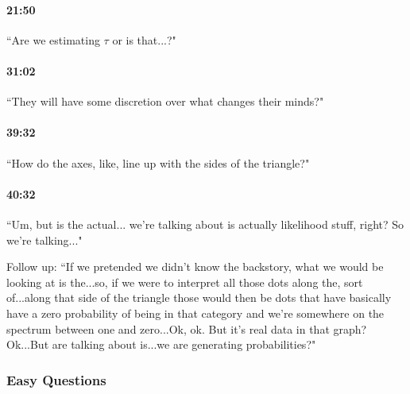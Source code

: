\documentclass[11pt]{article}
\begin{document}
\paragraph{21:50} ``Are we estimating $\tau$ or is that...?"

\paragraph{31:02} ``They will have some discretion over what changes their minds?"

\paragraph{39:32} ``How do the axes, like, line up with the sides of the triangle?"

\paragraph{40:32} ``Um, but is the actual... we're talking about is actually likelihood stuff, right? So we're talking..."

Follow up: ``If we pretended we didn't know the backstory, what we would be looking at is the...so, if we were to interpret all those dots along the, sort of...along that side of the triangle those would then be dots that have basically have a zero probability of being in that category and we're somewhere on the spectrum between one and zero...Ok, ok. But it's real data in that graph? Ok...But are talking about is...we are generating probabilities?"

\subsubsection{Easy Questions}
\end{document}
